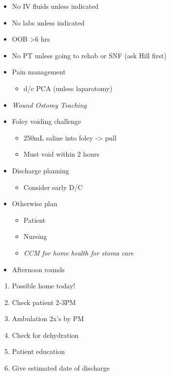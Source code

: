 \documentclass[
]{book}
\providecommand{\tightlist}{%
  \setlength{\itemsep}{0pt}\setlength{\parskip}{0pt}}
\begin{document}
\begin{itemize}
\tightlist
\item
  No IV fluids unless indicated
\item
  No labs unless indicated
\item
  OOB \textgreater6 hrs
\item
  No PT unless going to rehab or SNF (ask Hill first)
\item
  Pain management

  \begin{itemize}
  \tightlist
  \item
    d/c PCA (unless laparotomy)
  \end{itemize}
\item
  \emph{Wound Ostomy Teaching}
\item
  Foley voiding challenge

  \begin{itemize}
  \tightlist
  \item
    250mL saline into foley -\textgreater{} pull
  \item
    Must void within 2 hours
  \end{itemize}
\item
  Discharge planning

  \begin{itemize}
  \tightlist
  \item
    Consider early D/C
  \end{itemize}
\item
  Otherwise plan

  \begin{itemize}
  \tightlist
  \item
    Patient
  \item
    Nursing
  \item
    \emph{CCM for home health for stoma care}
  \end{itemize}
\item
  Afternoon rounds
\end{itemize}

\begin{enumerate}
\def\labelenumi{\arabic{enumi})}
\tightlist
\item
  Possible home today!
\item
  Check patient 2-3PM
\item
  Ambulation 2x's by PM
\item
  Check for dehydration
\item
  Patient education
\item
  Give estimated date of discharge
\end{enumerate}
\end{document}
